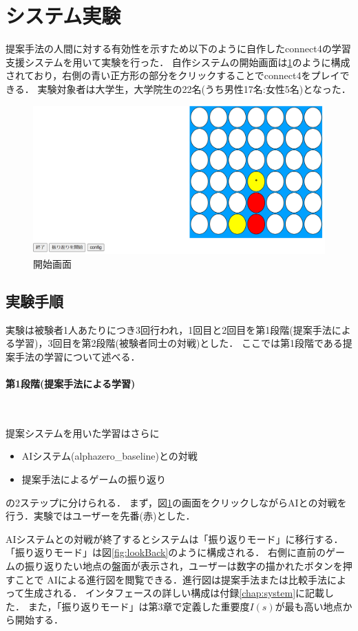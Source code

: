 \section{システム実験}
提案手法の人間に対する有効性を示すため以下のように自作したconnect4の学習支援システムを用いて実験を行った．
自作システムの開始画面は\ref{fig:basic}のように構成されており，右側の青い正方形の部分をクリックすることでconnect4をプレイできる．
実験対象者は大学生，大学院生の22名(うち男性17名:女性5名)となった．
\begin{figure}[t]
	\centering
	\includegraphics[width=\linewidth]{./figure/basicSystem.png}
	\caption{開始画面}
	\label{fig:basic}
\end{figure}
\subsection{実験手順}
実験は被験者1人あたりにつき3回行われ，1回目と2回目を第1段階(提案手法による学習)，3回目を第2段階(被験者同士の対戦)とした．
ここでは第1段階である提案手法の学習について述べる．
\newpage
\paragraph{第1段階(提案手法による学習)}~
\par 提案システムを用いた学習はさらに
\begin{itemize}
	\item AIシステム(alphazero\_baseline)との対戦
	\item 提案手法によるゲームの振り返り
\end{itemize}
の2ステップに分けられる．
まず，図\ref{fig:basic}の画面をクリックしながらAIとの対戦を行う．実験ではユーザーを先番(赤)とした．


AIシステムとの対戦が終了するとシステムは「振り返りモード」に移行する．
「振り返りモード」は図\ref{fig:lookBack}のように構成される．
右側に直前のゲームの振り返りたい地点の盤面が表示され，ユーザーは数字の描かれたボタンを押すことで
AIによる進行図を閲覧できる．進行図は提案手法または比較手法によって生成される．
インタフェースの詳しい構成は付録\ref{chap:system}に記載した．
また，「振り返りモード」は第3章で定義した重要度$I(s)$が最も高い地点から開始する．

